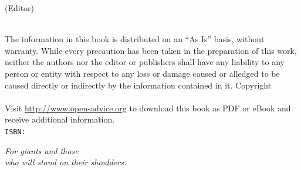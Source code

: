 \thispagestyle{empty}
\booktitle
\newpage
\newpage
\begin{titlepage}
\begin{flushright}
\bookeditor{} (Editor)\\
\vspace{10em}
{\Huge\bfseries\sffamily\booktitle}\\
\vspace{2em}
{\large\sffamily\booksubtitle}
\end{flushright}
\end{titlepage}
\thispagestyle{empty}
The information in this book is distributed on an ``As Is'' basis, without warranty. While every precaution has been taken in the preparation of this work, neither the authors nor the editor or publishers shall have any liability to any person or entity with respect to any loss or damage caused or alledged to be caused directly or indirectly by the information contained in it.%
\vfill
Copyright \textcopyright{} \bookyear{} \bookauthors\\
\newline
{}
\newline \\
Visit \url{http://www.open-advice.org} to download this book as PDF or eBook and receive additional information.
\newline \\
{\tt ISBN: \bookisbn}%
\newpage
\thispagestyle{empty}
\vspace*{2cm}
\begin{flushright}
{\Large\itshape For giants and those\\who will stand on their shoulders.}\\
\end{flushright}
\newpage
